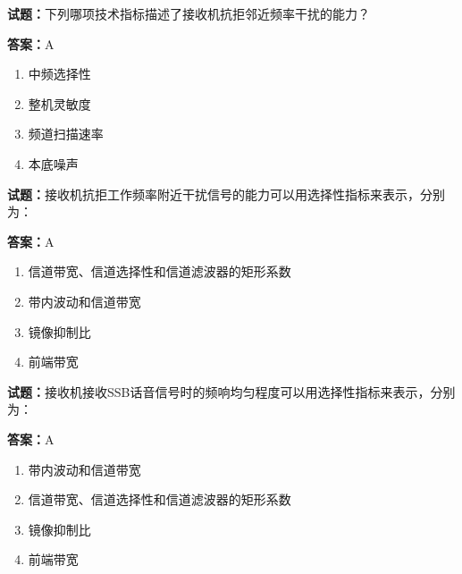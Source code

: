 \documentclass{ctexbook}
\begin{document}




\vspace{1em}

\textbf{试题：}下列哪项技术指标描述了接收机抗拒邻近频率干扰的能力？ 

\textbf{答案：}A 

\begin{enumerate}[leftmargin=3em]
  \item 中频选择性 

  \item 整机灵敏度 

  \item 频道扫描速率 

  \item 本底噪声 

\end{enumerate}





\vspace{1em}

\textbf{试题：}接收机抗拒工作频率附近干扰信号的能力可以用选择性指标来表示，分别为： 

\textbf{答案：}A 

\begin{enumerate}[leftmargin=3em]
  \item 信道带宽、信道选择性和信道滤波器的矩形系数 

  \item 带内波动和信道带宽 

  \item 镜像抑制比 

  \item 前端带宽 

\end{enumerate}






\vspace{1em}

\textbf{试题：}接收机接收SSB话音信号时的频响均匀程度可以用选择性指标来表示，分别为： 

\textbf{答案：}A 

\begin{enumerate}[leftmargin=3em]
  \item 带内波动和信道带宽 

  \item 信道带宽、信道选择性和信道滤波器的矩形系数 

  \item 镜像抑制比 

  \item 前端带宽 

\end{enumerate}
\end{document}
